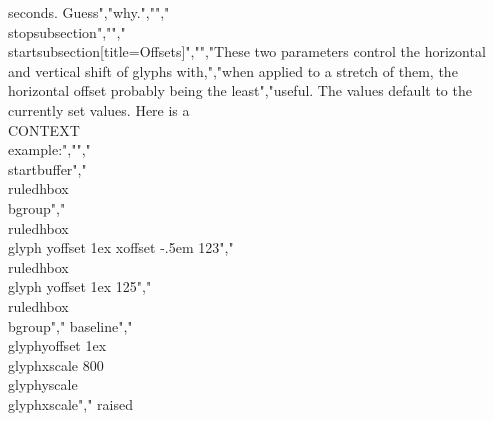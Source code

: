 seconds. Guess","why.","","\\stopsubsection","","\\startsubsection[title=Offsets]","","These two parameters control the horizontal and vertical shift of glyphs with,","when applied to a stretch of them, the horizontal offset probably being the least","useful. The values default to the currently set values. Here is a \\CONTEXT\\ example:","","\\startbuffer","\\ruledhbox \\bgroup","    \\ruledhbox {\\glyph yoffset 1ex xoffset -.5em 123}","    \\ruledhbox {\\glyph yoffset 1ex               125}","    \\ruledhbox \\bgroup","        baseline","        \\glyphyoffset 1ex \\glyphxscale 800 \\glyphyscale \\glyphxscale","        raised%